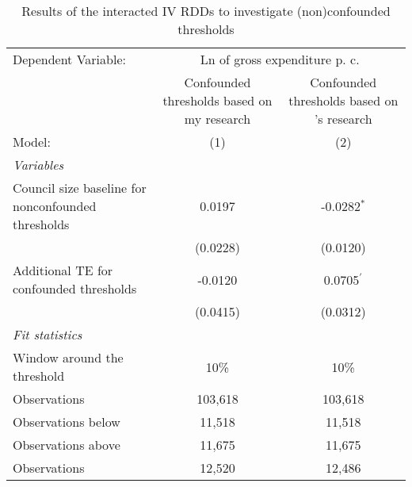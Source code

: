 
\begin{table}[htbp]
   \caption{\label{tab:rdd_conf_thresholds} Results of the interacted \ac{IV} \ac{RDD}s to investigate (non)confounded thresholds}
   \centering
   \begin{tabular}{lcc}
      \tabularnewline \midrule \midrule
      Dependent Variable: & \multicolumn{2}{c}{Ln of gross expenditure p. c.}\\
                                                                              & Confounded thresholds based on my research & Confounded thresholds based on \citeauthor{Hohmann.2017}'s \parencite*{Hohmann.2017} research \\     
      Model:                                                                  & (1)                                        & (2)\\  
      \midrule
      \emph{Variables}\\
      Council size baseline for nonconfounded thresholds                      & 0.0197                                     & -0.0282$^{*}$\\   
                                                                              & (0.0228)                                   & (0.0120)\\   
      Additional TE for confounded thresholds                                 & -0.0120                                    & 0.0705$^{'}$\\   
                                                                              & (0.0415)                                   & (0.0312)\\   
      \midrule
      \emph{Fit statistics}\\
      Window around the threshold                                             & 10\%                                       & 10\%\\   
      Observations                                                            & 103,618                                    & 103,618\\  
      Observations below                                                      & 11,518                                     & 11,518\\  
      Observations above                                                      & 11,675                                     & 11,675\\  
      Observations                                                            & 12,520                                     & 12,486\\  

\end{tabular}
\end{table}
